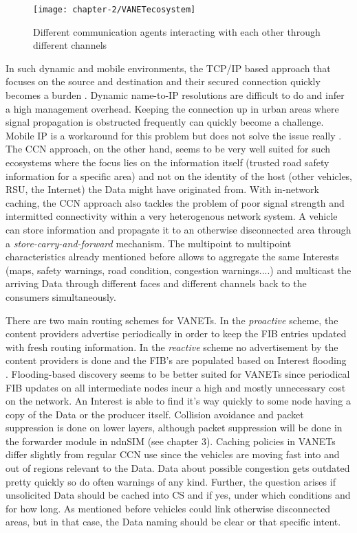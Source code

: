 \begin{figure}[H]
  \centering
  \texttt{[image: chapter-2/VANETecosystem]}
  \caption{Different communication agents interacting with each other through different channels}
  \label{fig:VANETecosystem}
\end{figure}

\vspace{5mm} %

In such dynamic and mobile environments, the TCP/IP based approach that focuses on the source and destination and their secured connection quickly becomes a burden \cite{wang12a}. Dynamic name-to-IP resolutions are difficult to do and infer a high management overhead. Keeping the connection up in urban areas where signal propagation is obstructed frequently can quickly become a challenge. Mobile IP is a workaround for this problem but does not solve the issue really \cite{amadeo16}. The CCN approach, on the other hand, seems to be very well suited for such ecosystems where the focus lies on the information itself (trusted road safety information for a specific area) and not on the identity of the host (other vehicles, RSU, the Internet) the Data might have originated from. With in-network caching, the CCN approach also tackles the problem of poor signal strength and intermitted connectivity within a very heterogenous network system. A vehicle can store information and propagate it to an otherwise disconnected area through a \emph{store-carry-and-forward} mechanism. The multipoint to multipoint characteristics already mentioned before allows to aggregate the same Interests (maps, safety warnings, road condition, congestion warnings....) and multicast the arriving Data through different faces and different channels back to the consumers simultaneously.

\vspace{5mm} %

There are two main routing schemes for VANETs. In the \emph{proactive} scheme, the content providers advertise periodically in order to keep the FIB entries updated with fresh routing information. In the \emph{reactive} scheme no advertisement by the content providers is done and the FIB's are populated based on Interest flooding \cite{amadeo16}. Flooding-based discovery seems to be better suited for VANETs since periodical FIB updates on all intermediate nodes incur a high and mostly unnecessary cost on the network. An Interest is able to find it's way quickly to some node having a copy of the Data or the producer itself. Collision avoidance and packet suppression is done on lower layers, although packet suppression will be done in the forwarder module in ndnSIM (see chapter 3).
Caching policies in VANETs differ slightly from regular CCN use since the vehicles are moving fast into and out of regions relevant to the Data. Data about possible congestion gets outdated pretty quickly so do often warnings of any kind. Further, the question arises if unsolicited Data should be cached into CS and if yes, under which conditions and for how long. As mentioned before vehicles could link otherwise disconnected areas, but in that case, the Data naming should be clear or that specific intent.

